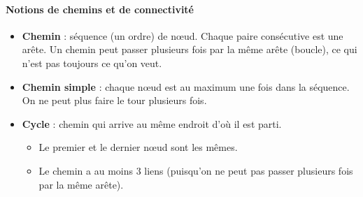 \paragraph{Notions de chemins et de connectivité}
\begin{itemize}

\item \textbf{Chemin} : séquence (un ordre) de nœud. Chaque paire consécutive est une arête. Un chemin peut passer plusieurs fois par la même arête (boucle), ce qui n'est pas toujours ce qu'on veut.
\item \textbf{Chemin simple} : chaque nœud est au maximum une fois dans la séquence. On ne peut plus faire le tour plusieurs fois.
\item \textbf{Cycle} : chemin qui arrive au même endroit d'où il est parti. 
	\begin{itemize}
			
	\item Le premier et le dernier nœud sont les mêmes. 
	\item Le chemin a au moins 3 liens (puisqu'on ne peut pas passer plusieurs fois par la même 	arête). 

\end{itemize}
\end{itemize}